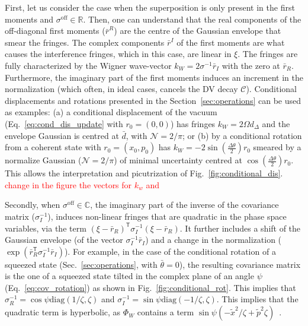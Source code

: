 \documentclass[%
reprint,
superscriptaddress,
nofootinbib,
 amsmath,amssymb,
prx,
floatfix,
]{revtex4-2}
\begin{document}
First, let us consider the case when the superposition is only present in the first moments and $ \sigma^{\text{off}} \in \mathds{R}$. Then, one can understand that the real components of the off-diagonal first moments ($\bar r^{R}$) are the centre of the Gaussian envelope that smear the fringes. The complex components $\bar r^{I}$ of the first moments are what causes the interference fringes, which in this case, are linear in $\xi$. The fringes are fully characterized by the Wigner wave-vector $k_W = 2 \sigma^{-1}\bar{r}_{I}$ with the zero at $\bar{r}_R$. Furthermore, the imaginary part of the first moments induces an increment in the normalization (which often, in ideal cases, cancels the DV decay $\mathcal{C}$). Conditional displacements and rotations presented in the Section~\ref{sec:operations} can be used as examples:  (a) a conditional displacement of the vacuum (Eq.~\ref{eq:cond_dis_update} with $r_0 = (0,0)$) has fringes $k_W =  2 \Omega d_{\Delta}$ and the envelope Gaussian is centred at $\bar{d}$, with $\mathcal{N} = 2/\pi$; or (b) by a conditional rotation from a coherent state with $r_0 = (x_0, p_0)$ has $k_W =  - 2\sin\!\left(\frac{\Delta\theta}{2}\right) r_0$ smeared by a normalize Gaussian ($\mathcal{N} = 2/\pi$) of minimal uncertainty centred at $\cos\!\left(\frac{\Delta\theta}{2}\right) r_0$. This allows the interpretation and picutrization of Fig.~\ref{fig:conditional_dis}. \textcolor{red}{change in the figure the vectors for $k_w$ and }


Secondly, when $\sigma^{\text{off}} \in \mathds{C}$, the imaginary part of the inverse of the covariance matrix ($\sigma_{I}^{-1}$), induces non-linear fringes that are quadratic in the phase space variables, via the term $(\xi-\bar r_R)^{\mathsf T} \sigma_{I}^{-1} (\xi-\bar r_R)$.
It further includes a shift of the Gaussian envelope (of the vector $\sigma_{I}^{-1}  \bar r_I$) and a change in the normalization ($\exp( \bar r_R^{\mathsf T} \sigma_{I}^{-1}  \bar r_I )$). 
For example, in the case of the conditional rotation of a squeezed state (Sec.~\ref{sec:operations}, with $\bar{\theta} = 0$), the resulting covariance matrix is the one of a squeezed state tilted in the complex plane of an angle $\psi$ (Eq.~\ref{eq:cov_rotation}) as shown in Fig.~\ref{fig:conditional_rot}. This implies that $\sigma^{-1}_R = \cos \psi \text{diag} \left(1/\zeta , \zeta  \right) $ and $\sigma^{-1}_I =  \sin \psi \text{diag} \left( - 1/\zeta , \zeta \right) $. This implies that the quadratic term is hyperbolic, as $\Phi_W $ contains a term $\sin \psi  \left( - \tilde{x}^2 /\zeta + \tilde{p}^2 \zeta \right) $~\cite{nicacio_phase_2010}.
\end{document}

